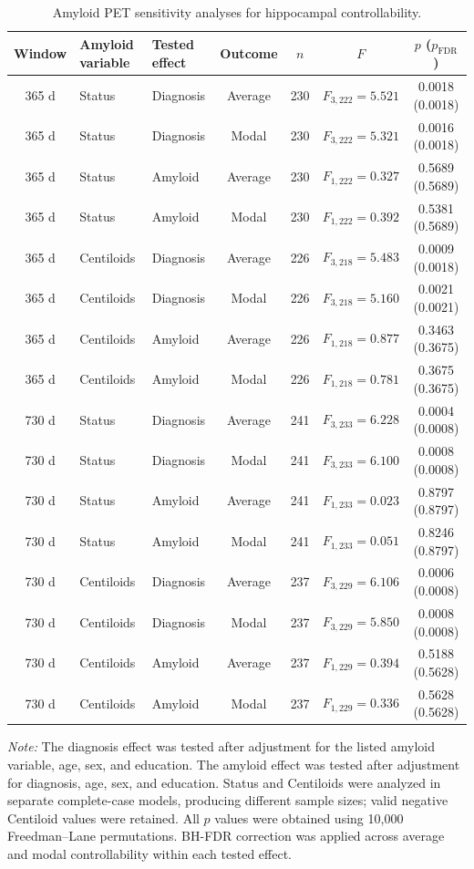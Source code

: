 \documentclass{article}
\begin{document}
\begin{table}[!htbp]
\centering
\caption{Amyloid PET sensitivity analyses for hippocampal controllability.}
\label{tab:tableS11}
\scriptsize
\setlength{\tabcolsep}{3pt}
\begin{tabular}{@{}cllcccc@{}}
\toprule
\textbf{Window} & \textbf{Amyloid variable} & \textbf{Tested effect} & \textbf{Outcome} & \textbf{$n$} & \textbf{$F$} & \textbf{$p$ ($p_{\mathrm{FDR}}$)}\\
\midrule
365 d & Status & Diagnosis & Average & 230 & $F_{3,222}=5.521$ & 0.0018 (0.0018) \\
365 d & Status & Diagnosis & Modal & 230 & $F_{3,222}=5.321$ & 0.0016 (0.0018) \\
365 d & Status & Amyloid & Average & 230 & $F_{1,222}=0.327$ & 0.5689 (0.5689) \\
365 d & Status & Amyloid & Modal & 230 & $F_{1,222}=0.392$ & 0.5381 (0.5689) \\
365 d & Centiloids & Diagnosis & Average & 226 & $F_{3,218}=5.483$ & 0.0009 (0.0018) \\
365 d & Centiloids & Diagnosis & Modal & 226 & $F_{3,218}=5.160$ & 0.0021 (0.0021) \\
365 d & Centiloids & Amyloid & Average & 226 & $F_{1,218}=0.877$ & 0.3463 (0.3675) \\
365 d & Centiloids & Amyloid & Modal & 226 & $F_{1,218}=0.781$ & 0.3675 (0.3675) \\
\midrule
730 d & Status & Diagnosis & Average & 241 & $F_{3,233}=6.228$ & 0.0004 (0.0008) \\
730 d & Status & Diagnosis & Modal & 241 & $F_{3,233}=6.100$ & 0.0008 (0.0008) \\
730 d & Status & Amyloid & Average & 241 & $F_{1,233}=0.023$ & 0.8797 (0.8797) \\
730 d & Status & Amyloid & Modal & 241 & $F_{1,233}=0.051$ & 0.8246 (0.8797) \\
730 d & Centiloids & Diagnosis & Average & 237 & $F_{3,229}=6.106$ & 0.0006 (0.0008) \\
730 d & Centiloids & Diagnosis & Modal & 237 & $F_{3,229}=5.850$ & 0.0008 (0.0008) \\
730 d & Centiloids & Amyloid & Average & 237 & $F_{1,229}=0.394$ & 0.5188 (0.5628) \\
730 d & Centiloids & Amyloid & Modal & 237 & $F_{1,229}=0.336$ & 0.5628 (0.5628) \\
\bottomrule
\end{tabular}

\vspace{1mm}
\footnotesize{\textit{Note:} The diagnosis effect was tested after adjustment for the listed amyloid variable, age, sex, and education. The amyloid effect was tested after adjustment for diagnosis, age, sex, and education. Status and Centiloids were analyzed in separate complete-case models, producing different sample sizes; valid negative Centiloid values were retained. All \(p\) values were obtained using 10,000 Freedman--Lane permutations. BH-FDR correction was applied across average and modal controllability within each tested effect.}

\end{table}
\end{document}
